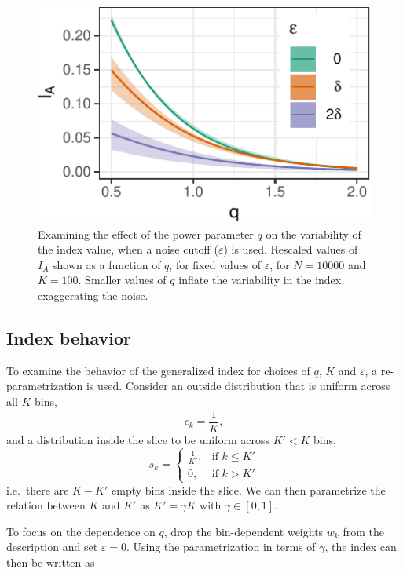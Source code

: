 \documentclass[]{interact}
\theoremstyle{plain}%
\theoremstyle{definition}
\theoremstyle{remark}
\begin{document}
\begin{figure}

{\centering \includegraphics[width=0.5\linewidth]{section_pursuit_files/figure-latex/noise-1} 

}

\caption{Examining the  effect of the power parameter $q$ on the variability of the  index value, when a noise cutoff ($\varepsilon$) is used. Rescaled values of $I_A$ shown as a function of $q$, for fixed values of $\varepsilon$, for $N=10000$ and $K=100$. Smaller values of  $q$ inflate the variability in the index, exaggerating  the noise.}\label{fig:noise}
\end{figure}

\hypertarget{index-behavior}{%
\subsection{\texorpdfstring{Index behavior
\label{sec:behaviour}}{Index behavior }}\label{index-behavior}}

To examine the behavior of the generalized index for choices of \(q\),
\(K\) and \(\varepsilon\), a re-parametrization is used. Consider an
outside distribution that is uniform across all \(K\) bins,
\begin{equation}
c_{k} = \frac{1}{K},
\end{equation} and a distribution inside the slice to be uniform across
\(K' < K\) bins, \begin{equation}
s_{k} = \begin{cases}
    \frac{1}{K'}, & \text{if $k \leq K'$}\\
    0, & \text{if $k > K'$}
  \end{cases}
\end{equation} i.e.~there are \(K-K'\) empty bins inside the slice. We
can then parametrize the relation between \(K\) and \(K'\) as
\(K' = \gamma K\) with \(\gamma \in [0,1]\).

To focus on the dependence on \(q\), drop the bin-dependent weights
\(w_k\) from the description and set \(\varepsilon=0\). Using the
parametrization in terms of \(\gamma\), the index can then be written as
\end{document}
